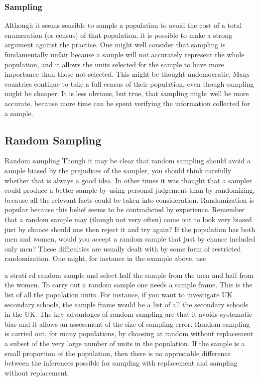 \documentclass[12pt]{article}
\begin{document}
\subsubsection{Sampling}
Although it seems sensible to sample a population to avoid the cost of a total enumeration (or
census) of that population, it is possible to make a strong argument against the practice. One might
well consider that sampling is fundamentally unfair because a sample will not accurately represent
the whole population, and it allows the units selected for the sample to have more importance
than those not selected. This might be thought undemocratic. Many countries continue to take
a full census of their population, even though sampling might be cheaper. It is less obvious, but
true, that sampling might well be more accurate, because more time can be spent verifying the
information collected for a sample.


\subsection{Random Sampling}
Random sampling Though it may be clear that random sampling should avoid a sample biased
by the prejudices of the sampler, you should think carefully whether that is always a good idea.
In other times it was thought that a sampler could produce a better sample by using personal
judgement than by randomizing, because all the relevant facts could be taken into consideration.
Randomization is popular because this belief seems to be contradicted by experience. Remember
that a random sample may (though not very often) come out to look very biased just by chance
should one then reject it and try again? If the population has both men and women, would you
accept a random sample that just by chance included only men? These difficulties are usually dealt
with by some form of restricted randomization. One might, for instance in the example above, use

a stratied random sample and select half the sample from the men and half from the women. To
carry out a random sample one needs a sample frame. This is the list of all the population units.
For instance, if you want to investigate UK secondary schools, the sample frame would be a list
of all the secondary schools in the UK. The key advantages of random sampling are that it avoids
systematic bias and it allows an assessment of the size of sampling error.
Random sampling is carried out, for many populations, by choosing at random without replacement
a subset of the very large number of units in the population. If the sample is a small proportion of
the population, then there is no appreciable difference between the inferences possible for sampling
with replacement and sampling without replacement.
\end{document}
